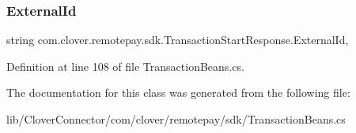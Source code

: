\subsubsection{\texorpdfstring{External\+Id}{ExternalId}}
{\footnotesize\ttfamily string com.\+clover.\+remotepay.\+sdk.\+Transaction\+Start\+Response.\+External\+Id\hspace{0.3cm}{\ttfamily [get]}, {\ttfamily [set]}}



Definition at line 108 of file Transaction\+Beans.\+cs.



The documentation for this class was generated from the following file\+:\begin{DoxyCompactItemize}
\item 
lib/\+Clover\+Connector/com/clover/remotepay/sdk/Transaction\+Beans.\+cs\end{DoxyCompactItemize}
